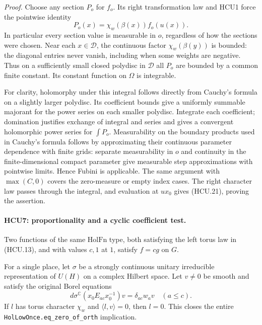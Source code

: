 \emph{Proof.}
Choose any section \(P_o\) for \(f_o\).  Its right transformation law
and HCU1 force the pointwise identity
\[
 P_o(x)=\chi_w(\beta(x))f_o(u(x)).
 \tag{HCU.22}
\]
In particular every section value is measurable in \(o\), regardless
of how the sections were chosen.  Near each \(x\in\mathcal D\),
the continuous factor \(\chi_w(\beta(y))\) is bounded: the diagonal
entries never vanish, including when some weights are negative.
Thus on a sufficiently small closed polydisc in \(\mathcal D\)
all \(P_o\) are bounded by a common finite constant.  Its constant
function on \(\Omega\) is integrable.

For clarity, holomorphy under this integral follows directly from
Cauchy's formula on a slightly larger polydisc.  Its coefficient
bounds give a uniformly summable majorant for the power series on
each smaller polydisc.  Integrate each coefficient; domination
justifies exchange of integral and series and gives a convergent
holomorphic power series for \(\int P_o\).
Measurability on the boundary products used in Cauchy's formula
follows by approximating their continuous parameter dependence with
finite grids: separate measurability in \(o\) and continuity in the
finite-dimensional compact parameter give measurable step
approximations with pointwise limits.  Hence Fubini is applicable.
The same argument with \(\max(C,0)\) covers the zero-measure or empty
index cases.  The right character law passes through the integral,
and evaluation at \(ux_0\) gives (HCU.21), proving the assertion.

\paragraph{HCU7: proportionality and a cyclic coefficient test.}
\label{claim:HCU7}
Two functions of the same \(\mathrm{HolFn}\) type, both satisfying
the left torus law in (HCU.13), and with values \(c,1\) at \(1\),
satisfy \(f=cg\) on \(G\).

For a single place, let \(\sigma\) be a strongly continuous unitary
irreducible representation of \(U(H)\) on a complex Hilbert space.
Let \(v\ne0\) be smooth and satisfy the original Borel equations
\[
 d\sigma^{\mathbb C}(x_0E_{ac}x_0^{-1})v
   =\delta_{ac}w_av\quad(a\le c).
 \tag{HCU.23}
\]
If \(l\) has torus character \(\chi_w\) and \(\langle l,v\rangle=0\),
then \(l=0\).  This closes the entire
\texttt{HolLowOnce.}\allowbreak\texttt{eq\_zero\_of\_orth} implication.


